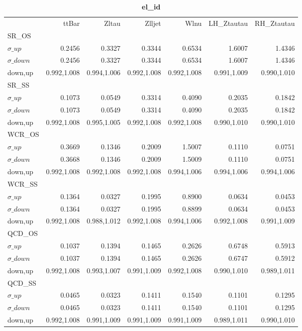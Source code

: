\documentclass[11pt,oneside,a4paper]{article}
\begin{document}
\begin{table}
\centering
\caption{\bf{el\_id}}
\begin{tabular}{lrrrrrr}
 & ttBar & Zltau & Zlljet & Wlnu & LH\_Ztautau & RH\_Ztautau \\
SR\_OS &  &  &  &  &  &  \\
$\sigma\_up$ & 0.2456 & 0.3327 & 0.3344 & 0.6534 & 1.6007 & 1.4346 \\
$\sigma\_down$ & 0.2456 & 0.3327 & 0.3344 & 0.6534 & 1.6007 & 1.4346 \\
down,up & 0.992,1.008 & 0.994,1.006 & 0.992,1.008 & 0.992,1.008 & 0.991,1.009 & 0.990,1.010 \\

\hline
SR\_SS &  &  &  &  &  &  \\
$\sigma\_up$ & 0.1073 & 0.0549 & 0.3314 & 0.4090 & 0.2035 & 0.1842 \\
$\sigma\_down$ & 0.1073 & 0.0549 & 0.3314 & 0.4090 & 0.2035 & 0.1842 \\
down,up & 0.992,1.008 & 0.995,1.005 & 0.992,1.008 & 0.992,1.008 & 0.990,1.010 & 0.990,1.010 \\

\hline
WCR\_OS &  &  &  &  &  &  \\
$\sigma\_up$ & 0.3669 & 0.1346 & 0.2009 & 1.5007 & 0.1110 & 0.0751 \\
$\sigma\_down$ & 0.3668 & 0.1346 & 0.2009 & 1.5009 & 0.1110 & 0.0751 \\
down,up & 0.992,1.008 & 0.992,1.008 & 0.992,1.008 & 0.994,1.006 & 0.994,1.006 & 0.994,1.006 \\

\hline
WCR\_SS &  &  &  &  &  &  \\
$\sigma\_up$ & 0.1364 & 0.0327 & 0.1995 & 0.8900 & 0.0634 & 0.0453 \\
$\sigma\_down$ & 0.1364 & 0.0327 & 0.1995 & 0.8899 & 0.0634 & 0.0453 \\
down,up & 0.992,1.008 & 0.988,1.012 & 0.992,1.008 & 0.994,1.006 & 0.992,1.008 & 0.991,1.009 \\

\hline
QCD\_OS &  &  &  &  &  &  \\
$\sigma\_up$ & 0.1037 & 0.1394 & 0.1465 & 0.2626 & 0.6748 & 0.5913 \\
$\sigma\_down$ & 0.1037 & 0.1394 & 0.1465 & 0.2626 & 0.6747 & 0.5912 \\
down,up & 0.992,1.008 & 0.993,1.007 & 0.991,1.009 & 0.992,1.008 & 0.990,1.010 & 0.989,1.011 \\

\hline
QCD\_SS &  &  &  &  &  &  \\
$\sigma\_up$ & 0.0465 & 0.0323 & 0.1411 & 0.1540 & 0.1101 & 0.1295 \\
$\sigma\_down$ & 0.0465 & 0.0323 & 0.1411 & 0.1540 & 0.1101 & 0.1295 \\
down,up & 0.992,1.008 & 0.991,1.009 & 0.991,1.009 & 0.991,1.009 & 0.989,1.011 & 0.990,1.010 \\

\hline
\end{tabular}
\end{table}
\end{document}
